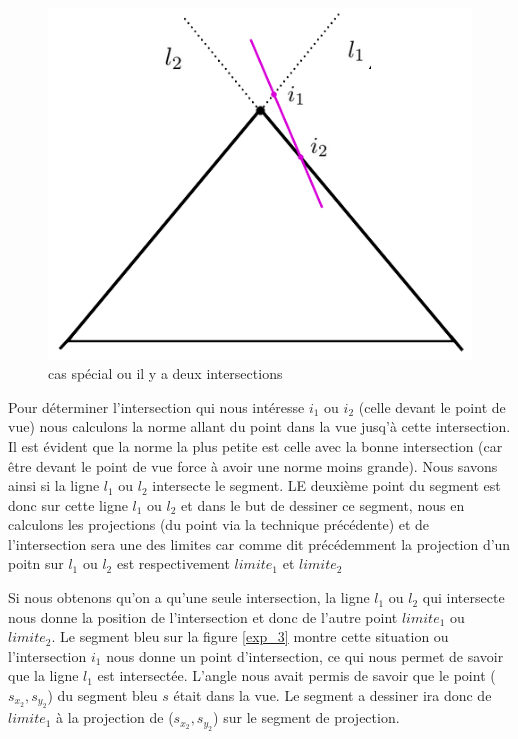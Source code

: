 \documentclass[11pt,a4paper]{article}
\begin{document}
\begin{figure}[!h]
\centering
\includegraphics[scale=0.6]{casSpecial1.png}
\caption{cas spécial ou il y a deux intersections}
\label{exp_4}
\end{figure}

Pour déterminer l'intersection qui nous intéresse $i_1$ ou $i_2$ (celle devant le point de vue)  nous calculons la norme allant du point dans la vue jusq'à cette intersection. Il est évident que la norme la plus petite est celle avec la bonne intersection (car être devant le point de vue force à avoir une norme moins grande). Nous savons ainsi si la ligne $l_1$ ou $l_2$ intersecte le segment. LE deuxième point du segment est donc sur cette ligne $l_1$ ou $l_2$ et dans le but de dessiner ce segment, nous en calculons les projections (du point via la technique précédente) et de l'intersection sera une des limites car comme dit précédemment la projection d'un poitn sur $l_1$ ou $l_2$ est respectivement $limite_1$ et $limite_2$

Si nous obtenons qu'on a qu'une seule intersection, la ligne $l_1$ ou $l_2$ qui intersecte nous donne la position de l'intersection et donc de l'autre point $limite_1$ ou $limite_2$. Le segment bleu sur la figure \ref{exp_3} montre cette situation ou l'intersection $i_1$ nous donne un point d'intersection, ce qui nous permet de savoir que la ligne $l_1$ est intersectée. L'angle nous avait permis de savoir que le point ($s_{x_2},s_{y_2}$) du segment bleu $s$ était dans la vue. Le segment a dessiner ira donc de $limite_1$ à la projection de ($s_{x_2},s_{y_2}$) sur le segment de projection.
\end{document}
